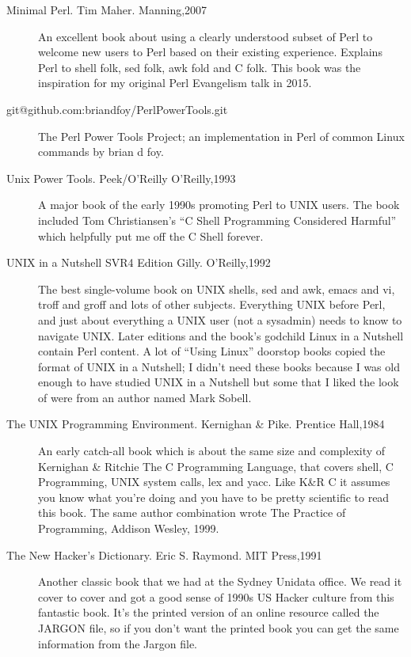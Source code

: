 \documentclass{article}
\begin{document}
\begin{description}

\item[Minimal Perl. Tim Maher. Manning,2007] An excellent book about
  using a clearly understood subset of Perl to welcome new users to
  Perl based on their existing experience. Explains Perl to shell
  folk, sed folk, awk fold and C folk. This book was the inspiration
  for my original Perl Evangelism talk in 2015.

\item[git@github.com:briandfoy/PerlPowerTools.git] The Perl Power
  Tools Project; an implementation in Perl of common Linux commands by
  brian d foy.

\item[Unix Power Tools. Peek/O'Reilly O'Reilly,1993] A
  major book of the early 1990s promoting Perl to UNIX users.
  The book included Tom Christiansen's ``C Shell Programming
  Considered  Harmful'' which helpfully put me off the C Shell
  forever.

\item[UNIX in a Nutshell SVR4 Edition Gilly. O'Reilly,1992] The best
  single-volume book on UNIX shells, sed and awk, emacs and vi, troff
  and groff and lots of other subjects. Everything UNIX before Perl,
  and just about everything a UNIX user (not a sysadmin) needs to know
  to navigate UNIX. Later editions and the book's godchild Linux in a
  Nutshell contain Perl content. A lot of ``Using Linux'' doorstop
  books copied the format of UNIX in a Nutshell; I didn't need these
  books because I was old enough to have studied UNIX in a Nutshell
  but some that I liked the look of were from an author named Mark
  Sobell.

\item[The UNIX Programming Environment. Kernighan \& Pike. Prentice
  Hall,1984] An early catch-all book which is about the same size and
  complexity   of Kernighan \& Ritchie The C Programming Language,
  that covers shell, C Programming, UNIX system calls, lex and
  yacc. Like K\&R C it assumes you know what you're doing and
  you have to be pretty scientific to read this book. The same author
  combination wrote The Practice of Programming, Addison Wesley,
  1999.

\item[The New Hacker's Dictionary. Eric S. Raymond. MIT Press,1991]
  Another classic book that we had at the Sydney Unidata office. We
  read it cover to cover and got a good sense of 1990s US Hacker
  culture from this fantastic book. It's the printed version of an
  online resource called the JARGON file, so if you don't want the
  printed book you can get the same information from the Jargon
  file.

\end{description}
\end{document}
